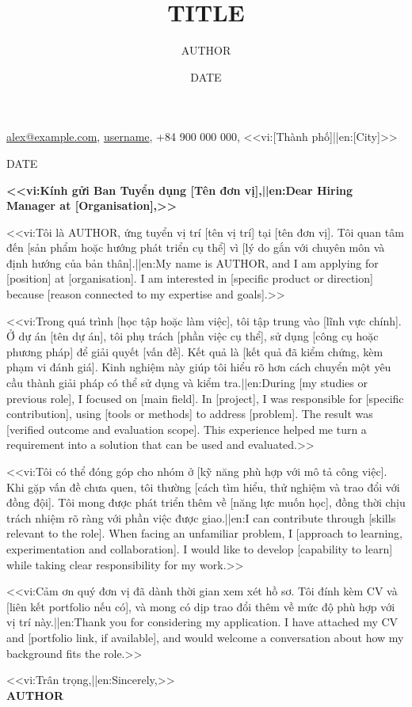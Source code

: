 \documentclass[a4paper,12pt]{article}
\title{{{TITLE}}}
\author{{{AUTHOR}}}
\date{{{DATE}}}
\begin{document}
\thispagestyle{plain}
  {\href{mailto:alex@example.com}{\faEnvelope\enspace alex@example.com},
   \href{https://linkedin.com/in/username}{\faLinkedinIn\enspace username},
   \faPhone\enspace +84 900 000 000,
   \faMapMarker\enspace <<vi:[Thành phố]||en:[City]>>}

\hfill {{DATE}}

\textbf{<<vi:Kính gửi Ban Tuyển dụng [Tên đơn vị],||en:Dear Hiring Manager at [Organisation],>>}

<<vi:Tôi là {{AUTHOR}}, ứng tuyển vị trí [tên vị trí] tại [tên đơn vị]. Tôi quan tâm đến [sản phẩm hoặc hướng phát triển cụ thể] vì [lý do gắn với chuyên môn và định hướng của bản thân].||en:My name is {{AUTHOR}}, and I am applying for [position] at [organisation]. I am interested in [specific product or direction] because [reason connected to my expertise and goals].>>

<<vi:Trong quá trình [học tập hoặc làm việc], tôi tập trung vào [lĩnh vực chính]. Ở dự án [tên dự án], tôi phụ trách [phần việc cụ thể], sử dụng [công cụ hoặc phương pháp] để giải quyết [vấn đề]. Kết quả là [kết quả đã kiểm chứng, kèm phạm vi đánh giá]. Kinh nghiệm này giúp tôi hiểu rõ hơn cách chuyển một yêu cầu thành giải pháp có thể sử dụng và kiểm tra.||en:During [my studies or previous role], I focused on [main field]. In [project], I was responsible for [specific contribution], using [tools or methods] to address [problem]. The result was [verified outcome and evaluation scope]. This experience helped me turn a requirement into a solution that can be used and evaluated.>>

<<vi:Tôi có thể đóng góp cho nhóm ở [kỹ năng phù hợp với mô tả công việc]. Khi gặp vấn đề chưa quen, tôi thường [cách tìm hiểu, thử nghiệm và trao đổi với đồng đội]. Tôi mong được phát triển thêm về [năng lực muốn học], đồng thời chịu trách nhiệm rõ ràng với phần việc được giao.||en:I can contribute through [skills relevant to the role]. When facing an unfamiliar problem, I [approach to learning, experimentation and collaboration]. I would like to develop [capability to learn] while taking clear responsibility for my work.>>

<<vi:Cảm ơn quý đơn vị đã dành thời gian xem xét hồ sơ. Tôi đính kèm CV và [liên kết portfolio nếu có], và mong có dịp trao đổi thêm về mức độ phù hợp với vị trí này.||en:Thank you for considering my application. I have attached my CV and [portfolio link, if available], and would welcome a conversation about how my background fits the role.>>

\begin{flushright}
  <<vi:Trân trọng,||en:Sincerely,>>\\[1.5em]
  \textbf{{{AUTHOR}}}
\end{flushright}
\end{document}
